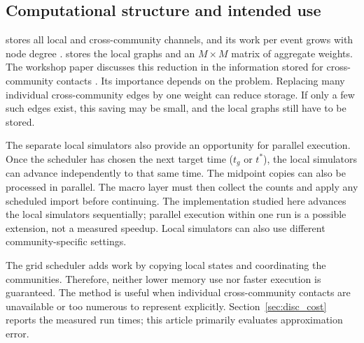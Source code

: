 \subsection{Computational structure and intended use}
\label{sec:cost}

\Full{} stores all local and cross-community channels, and its work per event grows with node degree \citep{kuryliak2025simulating}. \TS{} stores the local graphs and an $M\times M$ matrix of aggregate weights. The workshop paper discusses this reduction in the information stored for cross-community contacts \citep{kuryliak2025towards}. Its importance depends on the problem. Replacing many individual cross-community edges by one weight can reduce storage. If only a few such edges exist, this saving may be small, and the local graphs still have to be stored.

The separate local simulators also provide an opportunity for parallel execution. Once the scheduler has chosen the next target time ($t_g$ or $t^\ast$), the local simulators can advance independently to that same time. The midpoint copies can also be processed in parallel. The macro layer must then collect the counts and apply any scheduled import before continuing. The implementation studied here advances the local simulators sequentially; parallel execution within one run is a possible extension, not a measured speedup. Local simulators can also use different community-specific settings.

The grid scheduler adds work by copying local states and coordinating the communities. Therefore, neither lower memory use nor faster execution is guaranteed. The method is useful when individual cross-community contacts are unavailable or too numerous to represent explicitly. Section~\ref{sec:disc_cost} reports the measured run times; this article primarily evaluates approximation error.

\clearpage
\endgroup
